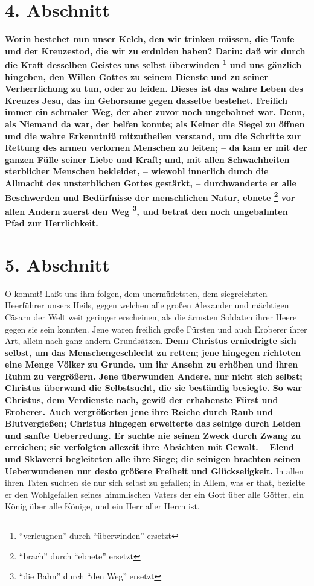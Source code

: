 \section{4. Abschnitt} \label{kap4_ab4}

 
\textbf{Worin bestehet nun unser Kelch, den wir trinken müssen, die Taufe und der
Kreuzestod, die wir zu erdulden haben? Darin: daß wir durch die Kraft desselben
Geistes uns selbst überwinden \footnote{"`verleugnen"' durch "`überwinden"' ersetzt} und uns gänzlich hingeben, den Willen Gottes zu
seinem Dienste und zu seiner Verherrlichung zu tun, oder zu leiden. Dieses ist
das wahre Leben des Kreuzes Jesu, das im Gehorsame gegen dasselbe bestehet.
Freilich immer ein schmaler Weg, der aber zuvor noch ungebahnet war. Denn, als
Niemand da war, der helfen konnte; als Keiner die Siegel  zu öffnen und die wahre
Erkenntniß mitzutheilen verstand, um die Schritte zur Rettung des armen
verlornen Menschen zu leiten; -- da kam er mit der ganzen Fülle seiner Liebe und
Kraft; und, mit allen Schwachheiten sterblicher Menschen bekleidet, -- wiewohl
innerlich durch die Allmacht  des unsterblichen Gottes gestärkt, -- durchwanderte
er alle Beschwerden und Bedürfnisse der menschlichen Natur, ebnete \footnote{"`brach"' durch "`ebnete"' ersetzt} vor allen
Andern zuerst den Weg \footnote{"`die Bahn"' durch "`den Weg"' ersetzt}, und betrat den noch ungebahnten Pfad zur Herrlichkeit.}

\section{5. Abschnitt} \label{kap4_ab5}

O kommt! Laßt uns ihm folgen, dem unermüdetsten, dem siegreichsten Heerführer
unsers Heils, gegen welchen alle großen Alexander  und mächtigen Cäsarn der Welt 
weit geringer erscheinen, als die ärmsten Soldaten ihrer Heere  gegen sie sein
konnten. Jene waren freilich große Fürsten und auch Eroberer  ihrer Art, allein
nach ganz andern Grundsätzen. \textbf{Denn Christus erniedrigte sich selbst, um das
Menschengeschlecht zu retten; jene hingegen richteten eine Menge Völker zu
Grunde, um ihr Ansehn zu erhöhen und ihren Ruhm zu vergrößern. Jene überwunden
Andere, nur nicht sich selbst; Christus überwand die Selbstsucht, die sie
beständig besiegte. So war Christus, dem Verdienste nach, gewiß der erhabenste
Fürst und Eroberer. Auch vergrößerten jene ihre Reiche durch Raub und
Blutvergießen; Christus hingegen erweiterte das seinige durch Leiden und sanfte
Ueberredung. Er suchte nie seinen Zweck durch Zwang zu erreichen; sie verfolgten
allezeit ihre Absichten mit Gewalt. -- Elend und Sklaverei begleiteten alle ihre
Siege; die seinigen brachten seinen Ueberwundenen nur desto größere Freiheit und
Glückseligkeit.} In allen ihren Taten suchten sie nur sich selbst zu gefallen;
in Allem, was er that, bezielte er den Wohlgefallen seines himmlischen Vaters
der ein Gott über alle Götter, ein König über alle Könige, und ein Herr aller
Herrn ist.

